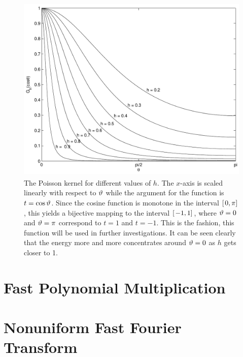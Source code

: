 \begin{figure}[tb]
  \centering
  \includegraphics[height=9cm,width=12cm]{images/poisson}
  \caption{The Poisson kernel for different values of $h$. The $x$-axis is scaled
  linearly
  with respect to $\vartheta$ while the argument for the function is $t=\cos\vartheta$. Since the cosine
  function is monotone in the interval $\left[\left.0,\pi\right]\right.$, this yields a bijective mapping to
  the interval $\left[\left.-1,1\right]\right.$, where $\vartheta = 0$ and $\vartheta = \pi$ correspond to
  $t=1$ and $t=-1$. This is the fashion, this function will be used in further
  investigations. It can be seen clearly that the energy more and more concentrates around
  $\vartheta = 0$ as $h$ gets closer to 1.}
  \label{Basics.Poissonkernel}
\end{figure}


\label{Basics:SphericalKernels}

\section{Fast Polynomial Multiplication}
\label{Basics:FastPolynomialMultiplication}

\section{Nonuniform Fast Fourier Transform}
\label{Basics:NFFT}
